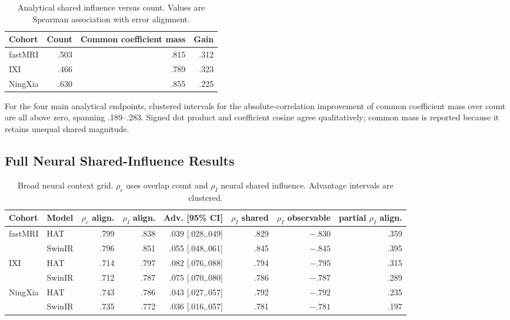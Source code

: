 \begin{table}[t]
\centering
\caption{Analytical shared influence versus count. Values are Spearman association with error alignment.}
\label{tab:analytic}
\setlength{\tabcolsep}{5pt}
\begin{tabular}{lrrr}
\toprule
Cohort & Count & Common coefficient mass & Gain \\
\midrule
fastMRI & .503 & .815 & .312 \\
IXI & .466 & .789 & .323 \\
NingXia & .630 & .855 & .225 \\
\bottomrule
\end{tabular}
\end{table}

For the four main analytical endpoints, clustered intervals for the absolute-correlation improvement of common coefficient mass over count are all above zero, spanning .189--.283. Signed dot product and coefficient cosine agree qualitatively; common mass is reported because it retains unequal shared magnitude.

\subsection{Full Neural Shared-Influence Results}
\begin{table}[t]
\centering
\caption{Broad neural context grid. $\rho_c$ uses overlap count and $\rho_I$ neural shared influence. Advantage intervals are clustered.}
\label{tab:neural-full}
\scriptsize
\setlength{\tabcolsep}{3pt}
\begin{tabular}{llrrrrrr}
\toprule
Cohort & Model & $\rho_c$ align. & $\rho_I$ align. & Adv. [95\% CI] & $\rho_I$ shared & $\rho_I$ observable & partial $\rho_I$ align. \\
\midrule
fastMRI & HAT & .799 & .838 & .039 [.028,.049] & .829 & $-.830$ & .359 \\
 & SwinIR & .796 & .851 & .055 [.048,.061] & .845 & $-.845$ & .395 \\
IXI & HAT & .714 & .797 & .082 [.076,.088] & .794 & $-.795$ & .315 \\
 & SwinIR & .712 & .787 & .075 [.070,.080] & .786 & $-.787$ & .289 \\
NingXia & HAT & .743 & .786 & .043 [.027,.057] & .792 & $-.792$ & .235 \\
 & SwinIR & .735 & .772 & .036 [.016,.057] & .781 & $-.781$ & .197 \\
\bottomrule
\end{tabular}
\end{table}

